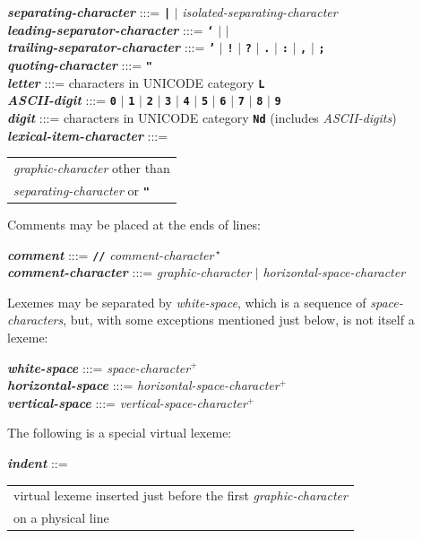 \documentclass[12pt]{article}
\newcommand{\TT}[1]{{\tt \bfseries #1}}
\newcommand{\PLUS}[1][]{{$^{+#1}$}}
\newcommand{\emkey}[1]{{\em \bfseries #1}}
\newenvironment{indpar}[1][0.3in]%
	{\begin{list}{}%
		     {\setlength{\itemsep}{0in}%
		      \setlength{\topsep}{0in}%
		      \setlength{\parsep}{1ex}%
		      \setlength{\labelwidth}{#1}%
		      \setlength{\leftmargin}{#1}%
		      \addtolength{\leftmargin}{\labelsep}}%
	 \item}%
	{\end{list}}
\begin{document}
\begin{indpar}
\emkey{separating-character} :::= \TT{|} $|$ {\em isolated-separating-character}
\\[1ex]
\emkey{leading-separator-character} :::=
	\TT{`} $|$ \TT{\textexclamdown} $|$ \TT{\textquestiondown}
\\
\emkey{trailing-separator-character} :::=
	\TT{'} $|$ \TT{!} $|$ \TT{?} $|$ \TT{.} $|$ \TT{:}
	       $|$ \TT{,} $|$ \TT{;}
\\[1ex]
\emkey{quoting-character} :::= \TT{"}
\\[1ex]
\emkey{letter} :::=
    characters in UNICODE category \TT{L}
\\
\emkey{ASCII-digit} :::= \TT{0} $|$ \TT{1} $|$ \TT{2} $|$ \TT{3} $|$ \TT{4}
                     $|$ \TT{5} $|$ \TT{6} $|$ \TT{7} $|$ \TT{8} $|$ \TT{9}
\\
\emkey{digit} :::=
    characters in UNICODE category \TT{Nd}
    (includes {\em ASCII-digits})
\\
\emkey{lexical-item-character} :::=
	\begin{tabular}[t]{l}
        {\em graphic-character} other than \\
	{\em separating-character} or \TT{"}
	\end{tabular}
\end{indpar}

Comments may be placed at the ends of lines:
\begin{indpar}
\emkey{comment}\label{COMMENT} :::=
    \TT{//} {\em comment-character}\,$^\star$
\\[1ex]
\emkey{comment-character} :::= {\em graphic-character}
                          $|$ {\em horizontal-space-character}
\end{indpar}

Lexemes may be separated by {\em white-space}, which
is a sequence of {\em space-characters},
but, with some exceptions mentioned just below, is not itself a lexeme:
\begin{indpar}
\emkey{white-space} :::= {\em space-character}\PLUS{}
\\[0.3ex]
\emkey{horizontal-space} :::= {\em horizontal-space-character}\PLUS{}
\\[0.3ex]
\emkey{vertical-space} :::= {\em vertical-space-character}\PLUS{}
\end{indpar}

The following is a special virtual lexeme:
\begin{indpar}
\emkey{indent}\label{INDENT} ::= \begin{tabular}[t]{l}
        virtual lexeme inserted just before the first
	{\em graphic-character} \\
	on a physical line
	\end{tabular}
\end{indpar}
\end{document}
